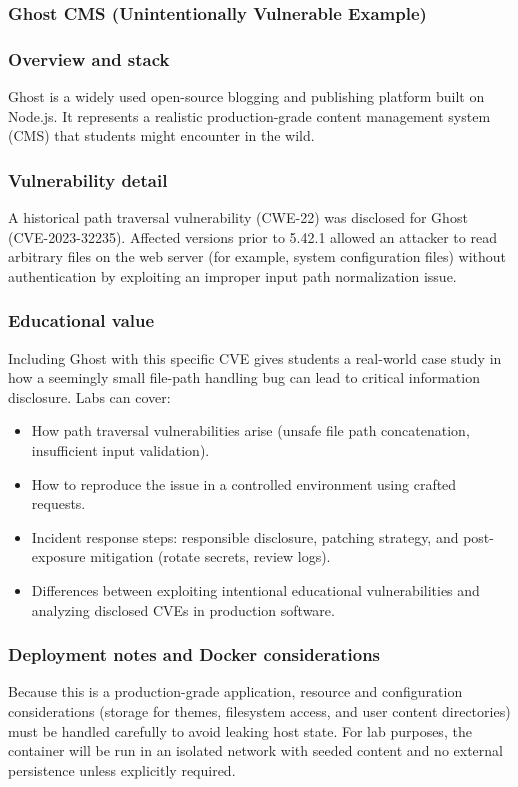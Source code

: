 \documentclass[12pt]{article}
\begin{document}
\subsubsection{Ghost CMS (Unintentionally Vulnerable Example)}
\subsubsection*{Overview and stack}
Ghost is a widely used open-source blogging and publishing platform built on Node.js. It represents a realistic production-grade content management system (CMS) that students might encounter in the wild.

\subsubsection*{Vulnerability detail}
A historical path traversal vulnerability (CWE-22) was disclosed for Ghost (CVE-2023-32235). Affected versions prior to 5.42.1 allowed an attacker to read arbitrary files on the web server (for example, system configuration files) without authentication by exploiting an improper input path normalization issue.

\subsubsection*{Educational value}
Including Ghost with this specific CVE gives students a real-world case study in how a seemingly small file-path handling bug can lead to critical information disclosure. Labs can cover:
\begin{itemize}
    \item How path traversal vulnerabilities arise (unsafe file path concatenation, insufficient input validation).
    \item How to reproduce the issue in a controlled environment using crafted requests.
    \item Incident response steps: responsible disclosure, patching strategy, and post-exposure mitigation (rotate secrets, review logs).
    \item Differences between exploiting intentional educational vulnerabilities and analyzing disclosed CVEs in production software.
\end{itemize}

\subsubsection*{Deployment notes and Docker considerations}
Because this is a production-grade application, resource and configuration considerations (storage for themes, filesystem access, and user content directories) must be handled carefully to avoid leaking host state. For lab purposes, the container will be run in an isolated network with seeded content and no external persistence unless explicitly required.
\end{document}
